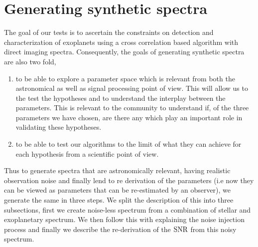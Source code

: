  \section{Generating synthetic spectra}
The goal of our tests is to ascertain the constraints on detection and characterization of exoplanets using a cross correlation based algorithm with direct imaging spectra.
Consequently, the goals of generating synthetic spectra are also two fold, 
\begin{enumerate}
    \item to be able to explore a parameter space which is relevant from both the astronomical as well as signal processing point of view.
    This will allow us to the test the hypotheses and to understand the interplay between the parameters.
    This is relevant to the community to understand if, of the three parameters we have chosen, are there any which play an important role in validating these hypotheses.
    \item to be able to test our algorithms to the limit of what they can achieve for each hypothesis from a scientific point of view.
\end{enumerate}
Thus to generate spectra that are astronomically relevant, having realistic observation noise and finally lend to re derivation of the parameters (i.e now they can be viewed as parameters that can be re-estimated by an observer), we generate the same in three steps.
We split the description of this into three subsections, first we create noise-less spectrum from a combination of stellar and exoplanetary spectrum.
We then follow this with explaining the noise injection process and finally we describe the re-derivation of the $\rm{SNR}$ from this noisy spectrum.
